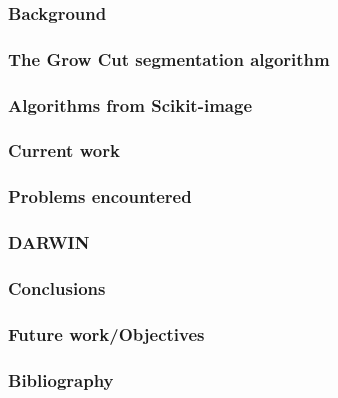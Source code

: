 \documentclass{beamer}
\begin{document}
\begin{frame}
\frametitle{Background}
\end{frame}

\begin{frame}
\frametitle{The Grow Cut segmentation algorithm}
\end{frame}

\begin{frame}
\frametitle{}
\end{frame}

\begin{frame}
\frametitle{Algorithms from Scikit-image} 
\end{frame}

\begin{frame}
\frametitle{Current work} 
\end{frame}

\begin{frame}
\frametitle{Problems encountered}
\end{frame}

\begin{frame}
\frametitle{DARWIN}
\end{frame}

\begin{frame}
\frametitle{Conclusions}
\end{frame}

\begin{frame}
\frametitle{Future work/Objectives}
\end{frame}

\begin{frame}
\frametitle{Bibliography}


\end{frame}
\end{document}

